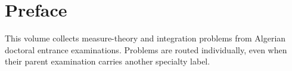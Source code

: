 \documentclass[print]{docmathdz}
\begin{document}
\chapter*{Preface}
This volume collects measure-theory and integration problems from Algerian doctoral entrance examinations. Problems are routed individually, even when their parent examination carries another specialty label.
\mainmatter


\backmatter\printbibliography[heading=bibintoc,title={References}]\printindex
\end{document}
